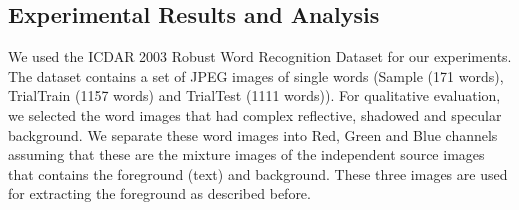 \subsection{Experimental Results and Analysis}

We used the ICDAR 2003 Robust Word Recognition Dataset \cite{A15} for our experiments.
The dataset contains a set of JPEG images of single words (Sample (171 words), 
TrialTrain (1157 words) and TrialTest (1111 words)). For qualitative evaluation,
we selected the word images that had complex reflective, shadowed and specular background.  
We separate these word images into Red, Green and Blue channels
assuming that these are the mixture images of the independent source images
that contains the foreground (text) and background. These three images are used
for extracting the foreground as described before.

\begin{table}[ht]
\centering
 \caption{Quantitative Results (Average)}
\end{table}
\begin{table}[ht]
\centering
 \caption{OCR Accuracy (\%)}
\end{table}

